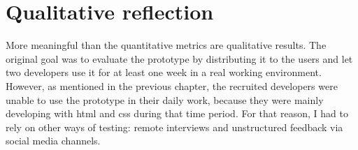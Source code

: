 \section{Qualitative reflection}\label{qualitative-reflection}

More meaningful than the quantitative metrics are qualitative results.
The original goal was to evaluate the prototype by distributing it to
the users and let two developers use it for at least one week in a real
working environment. However, as mentioned in the previous chapter, the
recruited developers were unable to use the prototype in their daily
work, because they were mainly developing with \ac{html} and \ac{css}
during that time period. For that reason, I had to rely on other ways of
testing: remote interviews and unstructured feedback via social media
channels.

